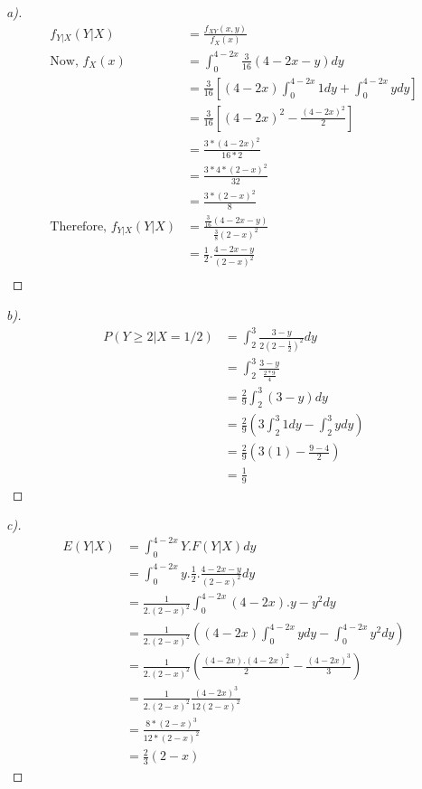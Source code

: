 \documentclass[12pt]{article}
\newenvironment{theorem}[2][Theorem]{\begin{trivlist}
\item[\hskip \labelsep {\bfseries #1}\hskip \labelsep {\bfseries #2.}]}{\end{trivlist}}
\begin{document}
\begin{theorem}[Ans]{6}
\begin{proof}[a)]
\begin{align*}
    f_{Y|X}(Y|X)&=\frac{f_{XY}(x,y)}{f_{X}(x)}\\
    \text{Now, }f_{X}(x) &= \int_{0}^{4-2x}\frac{3}{16}(4-2x-y)dy\\
    &= \frac{3}{16}[(4-2x)\int_{0}^{4-2x}1dy+\int_{0}^{4-2x}ydy]\\
    &= \frac{3}{16}[(4-2x)^{2}-\frac{(4-2x)^{2}}{2}]\\
    &= \frac{3*(4-2x)^{2}}{16*2}\\
    &= \frac{3*4*(2-x)^{2}}{32}\\
    &= \frac{3*(2-x)^{2}}{8}\\
    \text{Therefore, }f_{Y|X}(Y|X) &= \frac{\frac{3}{16}(4-2x-y)}{\frac{3}{8}(2-x)^{2}}\\
    &=\frac{1}{2}.\frac{4-2x-y}{(2-x)^{2}}\\
\end{align*}
\end{proof}

\begin{proof}[b)]
\begin{align*}
    P(Y\geq2|X=1/2)&=\int_{2}^{3}\frac{3-y}{2(2-\frac{1}{2})^{2}}dy\\
    &=\int_{2}^{3}\frac{3-y}{\frac{2*9}{4}}\\
    &=\frac{2}{9}\int_{2}^{3}(3-y)dy\\
    &=\frac{2}{9}(3\int_{2}^{3}1dy-\int_{2}^{3}ydy)\\
    &= \frac{2}{9}(3(1)-\frac{9-4}{2})\\
    &=\frac{1}{9}
\end{align*}
\end{proof}

\begin{proof}[c)]
\begin{align*}
    E(Y|X) &= \int_{0}^{4-2x}Y.F(Y|X)dy\\
    &=\int_{0}^{4-2x}y.\frac{1}{2}.\frac{4-2x-y}{(2-x)^{2}}dy\\
    &=\frac{1}{2.(2-x)^{2}}\int_{0}^{4-2x}(4-2x).y-y^{2}dy\\
    &=\frac{1}{2.(2-x)^{2}}((4-2x)\int_{0}^{4-2x}ydy-\int_{0}^{4-2x}y^{2}dy)\\
    &= \frac{1}{2.(2-x)^{2}}(\frac{(4-2x).(4-2x)^2}{2}-\frac{(4-2x)^{3}}{3})\\
    &= \frac{1}{2.(2-x)^{2}}\frac{(4-2x)^{3}}{12(2-x)^{2}}\\
    &= \frac{8*(2-x)^{3}}{12*(2-x)^{2}}\\
    &= \frac{2}{3}(2-x)
\end{align*}
\end{proof}
\end{theorem}
\end{document}

